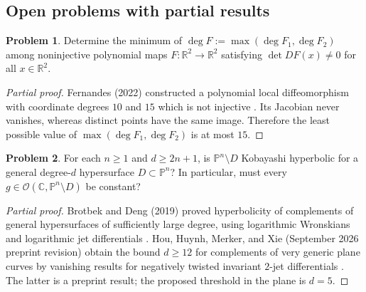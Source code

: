 \documentclass[11pt,reqno]{amsart}
\theoremstyle{definition}
\newtheorem{problem}{Problem}[section]
\theoremstyle{remark}
\begin{document}
\subsection{Open problems with partial results}

\begin{problem}\label{b95-9-2-2}
Determine the minimum of $\deg F:=\max(\deg F_1,\deg F_2)$ among noninjective polynomial maps $F:\mathbb R^2\to\mathbb R^2$ satisfying $\det DF(x)\neq0$ for all $x\in\mathbb R^2$.
\end{problem}
\begin{proof}[Partial proof]
Fernandes (2022) constructed a polynomial local diffeomorphism with coordinate degrees $10$ and $15$ which is not injective \cite{B95-Fernandes}. Its Jacobian never vanishes, whereas distinct points have the same image. Therefore the least possible value of $\max(\deg F_1,\deg F_2)$ is at most $15$.
\end{proof}

\begin{problem}\label{FS-3.23}
For each $n\geq1$ and $d\geq2n+1$, is $\mathbb P^n\setminus D$ Kobayashi hyperbolic for a general degree-$d$ hypersurface $D\subset\mathbb P^n$?
In particular, must every $g\in\mathcal O(\mathbb C,\mathbb P^n\setminus D)$ be constant?
\end{problem}
\begin{proof}[Partial proof]
Brotbek and Deng (2019) proved hyperbolicity of complements of general hypersurfaces of sufficiently large degree, using logarithmic Wronskians and logarithmic jet differentials \cite{FS-BrotbekDeng}. Hou, Huynh, Merker, and Xie (September 2026 preprint revision) obtain the bound $d\geq12$ for complements of very generic plane curves by vanishing results for negatively twisted invariant $2$-jet differentials \cite{FS-HHMX}. The latter is a preprint result; the proposed threshold in the plane is $d=5$.
\end{proof}
\end{document}
